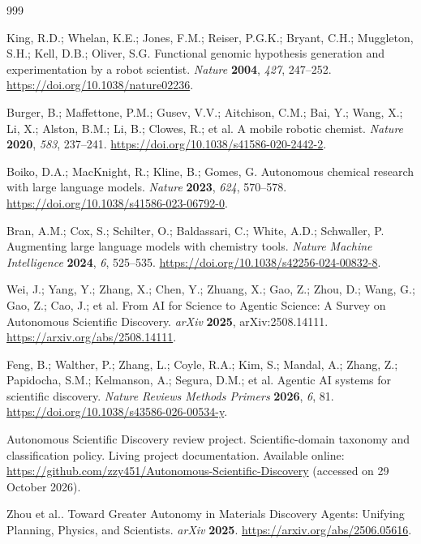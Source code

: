 \begin{thebibliography}{999}

King, R.D.; Whelan, K.E.; Jones, F.M.; Reiser, P.G.K.; Bryant, C.H.; Muggleton, S.H.; Kell, D.B.; Oliver, S.G.
Functional genomic hypothesis generation and experimentation by a robot scientist.
\emph{Nature} \textbf{2004}, \emph{427}, 247--252.
\url{https://doi.org/10.1038/nature02236}.

Burger, B.; Maffettone, P.M.; Gusev, V.V.; Aitchison, C.M.; Bai, Y.; Wang, X.; Li, X.; Alston, B.M.; Li, B.; Clowes, R.; et al.
A mobile robotic chemist.
\emph{Nature} \textbf{2020}, \emph{583}, 237--241.
\url{https://doi.org/10.1038/s41586-020-2442-2}.

Boiko, D.A.; MacKnight, R.; Kline, B.; Gomes, G.
Autonomous chemical research with large language models.
\emph{Nature} \textbf{2023}, \emph{624}, 570--578.
\url{https://doi.org/10.1038/s41586-023-06792-0}.

Bran, A.M.; Cox, S.; Schilter, O.; Baldassari, C.; White, A.D.; Schwaller, P.
Augmenting large language models with chemistry tools.
\emph{Nature Machine Intelligence} \textbf{2024}, \emph{6}, 525--535.
\url{https://doi.org/10.1038/s42256-024-00832-8}.

Wei, J.; Yang, Y.; Zhang, X.; Chen, Y.; Zhuang, X.; Gao, Z.; Zhou, D.; Wang, G.; Gao, Z.; Cao, J.; et al.
From AI for Science to Agentic Science: A Survey on Autonomous Scientific Discovery.
\emph{arXiv} \textbf{2025}, arXiv:2508.14111.
\url{https://arxiv.org/abs/2508.14111}.

Feng, B.; Walther, P.; Zhang, L.; Coyle, R.A.; Kim, S.; Mandal, A.; Zhang, Z.; Papidocha, S.M.; Kelmanson, A.; Segura, D.M.; et al.
Agentic AI systems for scientific discovery.
\emph{Nature Reviews Methods Primers} \textbf{2026}, \emph{6}, 81.
\url{https://doi.org/10.1038/s43586-026-00534-y}.

Autonomous Scientific Discovery review project.
Scientific-domain taxonomy and classification policy. Living project documentation.
Available online: \url{https://github.com/zzy451/Autonomous-Scientific-Discovery}
(accessed on 29 October 2026).


Zhou et al..
Toward Greater Autonomy in Materials Discovery Agents: Unifying Planning, Physics, and Scientists.
\emph{arXiv} \textbf{2025}.
\url{https://arxiv.org/abs/2506.05616}.


\end{thebibliography}
